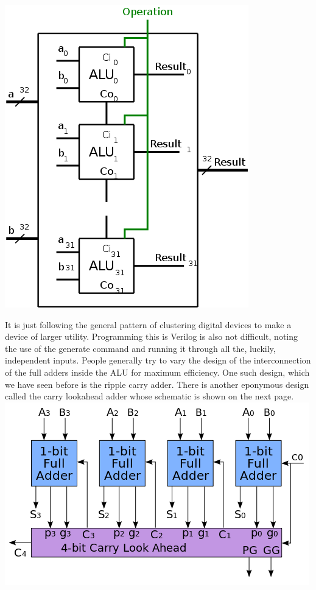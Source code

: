 \documentclass[11pt]{article}
\begin{document}
\begin{description}
\includegraphics[scale=0.5]{alu-32bit.png}

It is just following the general pattern of clustering digital devices to make a device of larger utility. Programming this is Verilog is also not difficult, noting the use of the generate command and running it through all the, luckily, independent inputs. People generally try to vary the design of the interconnection of the full adders inside the ALU for maximum efficiency. One such design, which we have seen before is the ripple carry adder. There is another eponymous design called the carry lookahead adder whose schematic is shown on the next page.
\includegraphics[scale=0.7]{cla.png}


\end{description}
\end{document}
